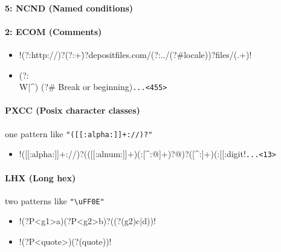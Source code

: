 \vspace{-2mm}
\paragraph{5: NCND (Named conditions)}

\vspace{-2mm}
\paragraph{2: ECOM (Comments)}
\begin{itemize}[noitemsep,topsep=0pt]
\item \cverb!(?:http://)?(?:\w+\.)?depositfiles.com/(?:../(?#locale))?files/(.+)!
\item \cverb@\n                     (?:\\W|^)    (?# Break or beginning)\n@\verb!...<455>!
\end{itemize}

\vspace{-2mm}
\paragraph{PXCC (Posix character classes)} one pattern like \verb!"([[:alpha:]]+://)?"!
\begin{itemize}[noitemsep,topsep=0pt]
\item \cverb!([[:alpha:]]+://)?(([[:alnum:]]+)(:[^:@]+)?@)?([^:]+)(:[[:digit!\verb!...<13>!
\end{itemize}

\vspace{-2mm}
\paragraph{LHX (Long hex)} two patterns like \verb!"\uFF0E"!
\begin{itemize}[noitemsep,topsep=0pt]
\item \cverb!(?P<g1>a)(?P<g2>b)?((?(g2)c|d))!
\item \cverb!(?P<quote>)(?(quote))!
\end{itemize}


